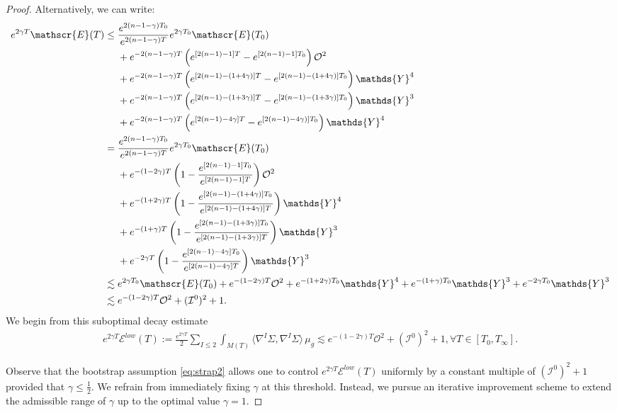 \documentclass{amsart}
\begin{document}
\begin{proof}
Alternatively, we can write:
\begin{align}
e^{2\gamma T} \mathscr{E}(T) \leq\; & \frac{e^{2(n-1-\gamma)T_{0}}}{e^{2(n-1-\gamma)T}} e^{2\gamma T_{0}} \mathscr{E}(T_{0}) \notag \\
& + e^{-2(n-1-\gamma)T} \left(e^{[2(n-1)-1]T} - e^{[2(n-1)-1]T_{0}}\right) \mathcal{O}^{2} \notag \\
& + e^{-2(n-1-\gamma)T} \left(e^{[2(n-1)-(1+4\gamma)]T} - e^{[2(n-1)-(1+4\gamma)]T_{0}}\right) \mathds{Y}^{4} \notag \\
& + e^{-2(n-1-\gamma)T} \left(e^{[2(n-1)-(1+3\gamma)]T} - e^{[2(n-1)-(1+3\gamma)]T_{0}}\right) \mathds{Y}^{3} \notag \\
& + e^{-2(n-1-\gamma)T} \left(e^{[2(n-1)-4\gamma]T} - e^{[2(n-1)-4\gamma)]T_{0}}\right) \mathds{Y}^{4} \notag \\
=\; & \frac{e^{2(n-1-\gamma)T_{0}}}{e^{2(n-1-\gamma)T}} e^{2\gamma T_{0}} \mathscr{E}(T_{0}) \notag \\
& + e^{-(1-2\gamma)T} \left(1 - \frac{e^{[2(n-1)-1]T_{0}}}{e^{[2(n-1)-1]T}}\right) \mathcal{O}^{2} \notag \\
& + e^{-(1+2\gamma)T} \left(1 - \frac{e^{[2(n-1)-(1+4\gamma)]T_{0}}}{e^{[2(n-1)-(1+4\gamma)]T}}\right) \mathds{Y}^{4} \notag \\
& + e^{-(1+\gamma)T} \left(1 - \frac{e^{[2(n-1)-(1+3\gamma)]T_{0}}}{e^{[2(n-1)-(1+3\gamma)]T}}\right) \mathds{Y}^{3} \notag \\
& + e^{-2\gamma T} \left(1 - \frac{e^{[2(n-1)-4\gamma]T_{0}}}{e^{[2(n-1)-4\gamma]T}}\right) \mathds{Y}^{3} \notag \\
\lesssim\; & e^{2\gamma T_{0}} \mathscr{E}(T_{0}) 
+ e^{-(1-2\gamma)T} \mathcal{O}^{2} 
+ e^{-(1+2\gamma)T_{0}} \mathds{Y}^{4} 
+ e^{-(1+\gamma)T_{0}} \mathds{Y}^{3} 
+ e^{-2\gamma T_{0}} \mathds{Y}^{3} \notag \\
\lesssim\; & e^{-(1-2\gamma)T} \mathcal{O}^{2} + (\mathcal{I}^{0})^{2} + 1.
\end{align}
We begin from this suboptimal decay estimate 
\begin{align}
\label{eq:suboptimal_recall}
e^{2\gamma T} \mathscr{E}^{low}(T) := \frac{e^{2\gamma T}}{2} \sum_{I\leq 2} \int_{M(T)} \langle \nabla^{I}\Sigma, \nabla^{I}\Sigma \rangle \, \mu_g
\lesssim e^{-(1-2\gamma)T} \mathcal{O}^2 + (\mathcal{I}^0)^2 + 1,  \forall T \in [T_0, T_\infty].
\end{align}

\noindent Observe that the bootstrap assumption \eqref{eq:strap2} allows one to control $e^{2\gamma T}\mathscr{E}^{low}(T)$ uniformly by a constant multiple of $(\mathcal{I}^0)^2 + 1$ provided that $\gamma \leq \frac{1}{2}$. We refrain from immediately fixing $\gamma$ at this threshold. Instead, we pursue an iterative improvement scheme to extend the admissible range of $\gamma$ up to the optimal value $\gamma = 1$.


\end{proof}
\end{document}
